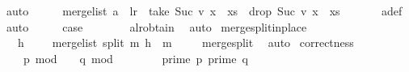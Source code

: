 \begin{isabellebody}
\ auto\isanewline
\ \ \isamarkupfalse%
\ \isamarkupfalse%
\ {\isachardoublequoteopen}merge{\isacharunderscore}{\kern0pt}list\ {\isacharparenleft}{\kern0pt}a\ {\isacharhash}{\kern0pt}\ l{\isacharunderscore}{\kern0pt}r{\isacharparenright}{\kern0pt}\ {\isacharequal}{\kern0pt}\ {\isacharparenleft}{\kern0pt}take\ {\isacharparenleft}{\kern0pt}Suc\ v{\isacharparenright}{\kern0pt}\ {\isacharparenleft}{\kern0pt}x\ {\isacharhash}{\kern0pt}\ xs{\isacharparenright}{\kern0pt}{\isacharparenright}{\kern0pt}\ {\isacharat}{\kern0pt}\ {\isacharparenleft}{\kern0pt}drop\ {\isacharparenleft}{\kern0pt}Suc\ v{\isacharparenright}{\kern0pt}\ {\isacharparenleft}{\kern0pt}x\ {\isacharhash}{\kern0pt}\ xs{\isacharparenright}{\kern0pt}{\isacharparenright}{\kern0pt}{\isachardoublequoteclose}\ \isanewline
\ \ \ \ \isamarkupfalse%
\ a{\isacharunderscore}{\kern0pt}def\ \isamarkupfalse%
\ auto\isanewline
\isanewline
\ \ \isamarkupfalse%
\ \isamarkupfalse%
\ {\isacharquery}{\kern0pt}case\ \ \isanewline
\ \ \ \ \isamarkupfalse%
\ a{\isacharunderscore}{\kern0pt}l{\isacharunderscore}{\kern0pt}r{\isacharunderscore}{\kern0pt}obtain\ \isamarkupfalse%
\ auto\isanewline
{}\isamarkupfalse%
%
\endisatagproof
{\isafoldproof}%
%
\isadelimproof
\isanewline
%
\endisadelimproof
\isanewline
{}\isamarkupfalse%
\ merge{\isacharunderscore}{\kern0pt}split{\isacharunderscore}{\kern0pt}in{\isacharunderscore}{\kern0pt}place{\isacharcolon}{\kern0pt}\isanewline
\ \ \ {\isachardoublequoteopen}h\ {\isachargreater}{\kern0pt}\ {}\ {\isasymLongrightarrow}\ \ merge{\isacharunderscore}{\kern0pt}list\ {\isacharparenleft}{\kern0pt}split\ m\ h{\isacharparenright}{\kern0pt}\ {\isacharequal}{\kern0pt}\ m{\isachardoublequoteclose}\ \isanewline
%
\isadelimproof
\ \ %
\endisadelimproof
%
\isatagproof
{}\isamarkupfalse%
\ merge{\isacharunderscore}{\kern0pt}split\ \isamarkupfalse%
\ auto%
\endisatagproof
{\isafoldproof}%
%
\isadelimproof
\isanewline
%
\endisadelimproof
\isanewline
\isanewline
{}\isamarkupfalse%
\ correctness{\isacharcolon}{\kern0pt}\isanewline
\ \ \ \isanewline
\ \ \ \ {\isachardoublequoteopen}p\ mod\ {}\ {\isacharequal}{\kern0pt}\ {}{\isachardoublequoteclose}\ {\isachardoublequoteopen}q\ mod\ {}\ {\isacharequal}{\kern0pt}\ {}{\isachardoublequoteclose}\ \isanewline
\ \ \ \ {\isachardoublequoteopen}prime\ p{\isachardoublequoteclose}\ {\isachardoublequoteopen}prime\ q{\isachardoublequoteclose}\ \isanewline

\end{isabellebody}
